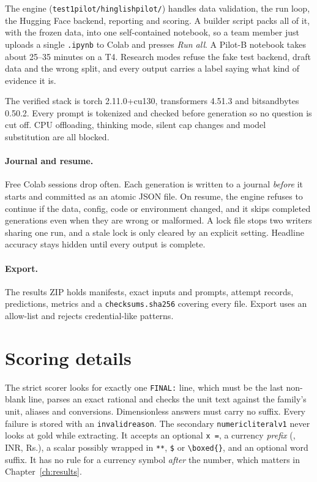 \documentclass[12pt,a4paper,oneside]{report}
\renewcommand{\_}{\oldunderscore\allowbreak}
\newcommand{\rs}{\rupee}
\begin{document}
The engine (\texttt{test1\_pilot/hinglish\_pilot/}) handles data validation, the run loop, the Hugging Face backend, reporting and scoring. A builder script packs all of it, with the frozen data, into one self-contained notebook, so a team member just uploads a single \texttt{.ipynb} to Colab and presses \emph{Run all}. A Pilot-B notebook takes about 25--35 minutes on a T4. Research modes refuse the fake test backend, draft data and the wrong split, and every output carries a label saying what kind of evidence it is.

The verified stack is torch 2.11.0+cu130, transformers 4.51.3 and bitsandbytes 0.50.2. Every prompt is tokenized and checked before generation so no question is cut off. CPU offloading, thinking mode, silent cap changes and model substitution are all blocked.

\paragraph{Journal and resume.} Free Colab sessions drop often. Each generation is written to a journal \emph{before} it starts and committed as an atomic JSON file. On resume, the engine refuses to continue if the data, config, code or environment changed, and it skips completed generations even when they are wrong or malformed. A lock file stops two writers sharing one run, and a stale lock is only cleared by an explicit setting. Headline accuracy stays hidden until every output is complete.

\paragraph{Export.} The results ZIP holds manifests, exact inputs and prompts, attempt records, predictions, metrics and a \texttt{checksums.sha256} covering every file. Export uses an allow-list and rejects credential-like patterns.

\section{Scoring details}

The strict scorer looks for exactly one \texttt{FINAL:} line, which must be the last non-blank line, parses an exact rational and checks the unit text against the family's unit, aliases and conversions. Dimensionless answers must carry no suffix. Every failure is stored with an \texttt{invalid\_reason}. The secondary \texttt{numeric\_literal\_v1} never looks at gold while extracting. It accepts an optional \texttt{x =}, a currency \emph{prefix} (\rs, INR, Rs.), a scalar possibly wrapped in \texttt{**}, \texttt{\$} or \verb|\boxed{}|, and an optional word suffix. It has no rule for a currency symbol \emph{after} the number, which matters in Chapter~\ref{ch:results}.
\end{document}
